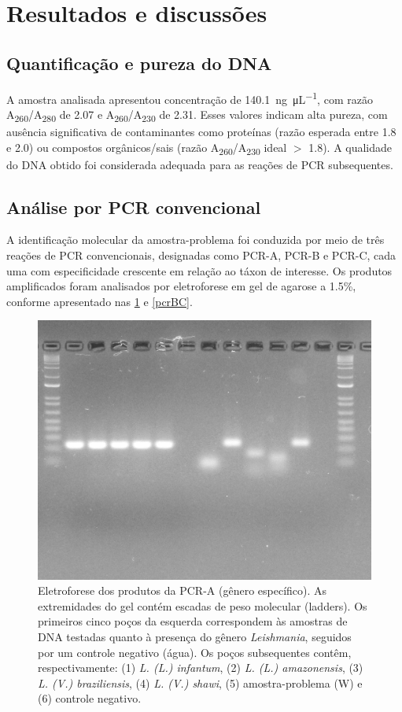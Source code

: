 \section{Resultados e discussões}
\subsection{Quantificação e pureza do DNA} 
A amostra analisada apresentou concentração de
\qty{140,1}{\nano\gram\per\micro\liter}, com razão
A\textsubscript{260}/A\textsubscript{280} de \num{2,07} e
A\textsubscript{260}/A\textsubscript{230} de \num{2,31}. Esses valores indicam
alta pureza, com ausência significativa de contaminantes como proteínas (razão
esperada entre \num{1.8} e \num{2.0}) ou compostos orgânicos/sais (razão
A\textsubscript{260}/A\textsubscript{230} ideal \(>\) \num{1.8})\cite{nanodrop}. A
qualidade do DNA obtido foi considerada adequada para as reações de PCR
subsequentes.

\subsection{Análise por PCR convencional} A identificação molecular da
amostra-problema foi conduzida por meio de três reações de PCR convencionais,
designadas como PCR-A, PCR-B e PCR-C, cada uma com especificidade crescente em
relação ao táxon de interesse. Os produtos amplificados foram analisados por
eletroforese em gel de agarose a \num{1.5}\%, conforme apresentado nas
\cref{pcrA} e \cref{pcrBC}.

\begin{figure}
 \centering
 \includegraphics[width=.4\textwidth]{fig/pcrA_rflp_g8.jpg}
 \caption{Eletroforese dos produtos da PCR-A (gênero específico). As extremidades do gel contém escadas de peso molecular (ladders). 
 Os primeiros cinco poços da esquerda correspondem às amostras de DNA testadas quanto à presença do gênero \textit{Leishmania}, 
 seguidos por um controle negativo (água). Os poços subsequentes contêm, respectivamente: (1) \textit{L. (L.) infantum}, 
 (2) \textit{L. (L.) amazonensis}, (3) \textit{L. (V.) braziliensis}, (4) \textit{L. (V.) shawi}, (5) amostra-problema (W) e (6) controle negativo.}
 \label{pcrA}
 \end{figure}

